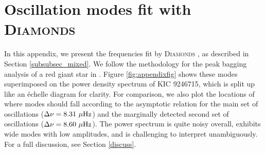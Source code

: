 \appendix
\section{Oscillation modes fit with \textsc{D\large{iamonds}}}
\label{appendix}

In this appendix, we present the frequencies fit by \textsc{D\large{iamonds}} \citep{cor14}, as described in Section \ref{subsubsec_mixed}. We follow the methodology for the peak bagging analysis of a red giant star in \citet{cor15}. Figure \ref{fig:appendixfig} shows these modes superimposed on the power density spectrum of KIC 9246715, which is split up like an \'echelle diagram for clarity. For comparison, we also plot the locations of where modes should fall according to the asymptotic relation \citep{mos12} for the main set of oscillations ($\Delta \nu = 8.31 \ \mu \rm{Hz}$) and the marginally detected second set of oscillations ($\Delta \nu = 8.60 \ \mu \rm{Hz}$). The power spectrum is quite noisy overall, exhibits wide modes with low amplitudes, and is challenging to interpret unambiguously. For a full discussion, see Section \ref{discuss}.